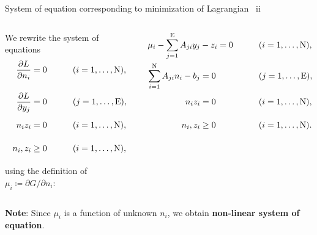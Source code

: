 %
%
\begin{frame}{System of equation corresponding to minimization of Lagrangian \, ii}

\small
\begin{columns}[c]
%
%
We rewrite the system of equations \\[10pt]
%
\begin{alignat*}{2}
\frac{\partial L}{\partial n_{i}} & =0 & \qquad\vphantom{\frac{\partial L}{\partial y_{j}}} & (i=1,\ldots,\text{N}),\\[10pt]
\frac{\partial L}{\partial y_{j}} & =0 & \vphantom{\frac{\partial L}{\partial y_{j}}} & (j=1,\ldots,\text{E}),\\
n_{i}z_{i} & =0 & \vphantom{\frac{\partial L}{\partial y_{j}}} & (i=1,\ldots,\text{N}),\\
n_{i},z_{i} & \geq0 & \vphantom{\frac{\partial L}{\partial y_{j}}} & (i=1,\ldots,\text{N}),
\end{alignat*}
%
using the definition of $\mu_{i}\coloneqq\partial G/\partial n_{i}$: 
\begin{overprint}
\begin{alignat*}{2}
\mu_{i}-\sum_{j=1}^{\text{E}}A_{ji}y_{j} & -z_{i}=0 & \qquad\vphantom{\frac{\partial L}{\partial y_{j}}} & (i=1,\ldots,\text{N}),\\
\sum_{i=1}^{\text{N}}A_{ji}n_{i}-b_{j} & =0 & \vphantom{\frac{\partial L}{\partial y_{j}}} & (j=1,\ldots,\text{E}),\\
n_{i}z_{i} & =0 & \vphantom{\frac{\partial L}{\partial y_{j}}} & (i=1,\ldots,\text{N}),\\
n_{i},z_{i} & \geq0 & \vphantom{\frac{\partial L}{\partial y_{j}}} & (i=1,\ldots,\text{N}).
\end{alignat*}
\end{overprint}
\end{columns}

\alert{\bf Note}: Since $\mu_{i}$ is a function of unknown $n_{i}$, we obtain {\bf non-linear system of equation}.

\end{frame}


